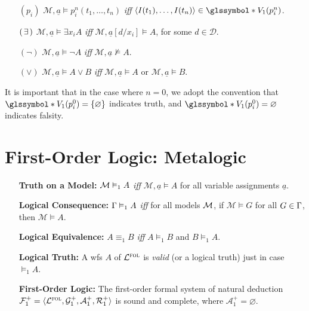 \documentclass[a4paper, 11pt]{article} %
\newcommand{\g}{\glssymbol*}%
\begin{document}
\begin{enumerate}[leftmargin=1.2in,labelsep=.15in]
\begin{small}
\begin{itemize}[leftmargin=.36in]
\item[$(p_i)$] $\mathcal{M},\underline{a}\vDash  p_i^n(t_1,\dots,t_n)$ \textit{iff} $\tuple{I(t_1),\dots,I(t_n)}\in \g{V}_1(p_i^n)$.
\item[$(\hspace{1.5pt}\exists\hspace{1.5pt})$] $\mathcal{M},\underline{a}\vDash  \exists x_iA$ \textit{iff} $\mathcal{M},\underline{a}[d/x_i]\vDash A$, for some $d\in\mathcal{D}$.
\item[$(\neg)$] $\mathcal{M},\underline{a}\vDash  \neg A$ \textit{iff} $\mathcal{M},\underline{a}\nvDash A$.
\item[$(\vee)$] $\mathcal{M},\underline{a}\vDash  A\vee B$ \textit{iff} $\mathcal{M},\underline{a}\vDash  A$ or $\mathcal{M},\underline{a}\vDash  B$.
\end{itemize}
\end{small}
It is important that in the case where $n=0$, we adopt the convention that $\g{V}_1(p_i^0)=\set{\varnothing}$ indicates truth, and $\g{V}_1(p_i^0)=\varnothing$ indicates falsity.
\end{enumerate}



\section*{\sc First-Order Logic: Metalogic}%

\begin{enumerate}[leftmargin=1.2in,labelsep=.15in] %
\item[\bf Truth on a Model:] $\mathcal{M}\vDash_1 A$ \textit{iff} $\mathcal{M},\underline{a}\vDash A$ for all variable assignments $\underline{a}$.
\item[\bf Logical Consequence:] $\Gamma\vDash_1 A$ \textit{iff} for all models $\mathcal{M}$, if $\mathcal{M}\vDash G$ for all $G\in\Gamma$, then $\mathcal{M}\vDash A$.
\item[\bf Logical Equivalence:] $A\equiv_1 B$ \textit{iff} $A\vDash_1 B$ and $B\vDash_1 A$.  
\item[\bf Logical Truth:] A wfs $A$ of $\mathcal{L}^{\textsc{fol}}$ is \textit{valid} (or a logical truth) just in case $\vDash_1 A$.
\item[\bf First-Order Logic:] The first-order formal system of natural deduction $\mathcal{F}_1^+=\langle\mathcal{L}^{\textsc{fol}},\mathcal{G}_1^+,\mathcal{A}_1^+,\mathcal{R}_1^+\rangle$ is sound and complete, where $\mathcal{A}_1^+=\varnothing$.
\end{enumerate}
\end{document}
